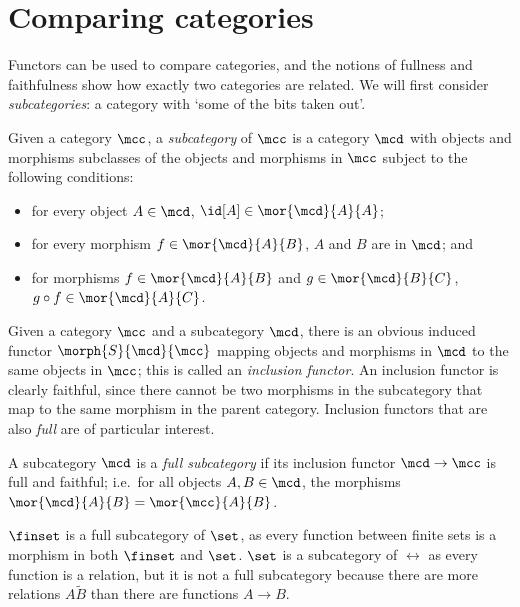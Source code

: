 \section{Comparing categories}

Functors can be used to compare categories, and the notions of fullness and
faithfulness show how exactly two categories are related.
We will first consider \emph{subcategories}: a category with `some of the bits
taken out'.

\begin{definition}[Subcategory]
    Given a category \(\mcc\), a \emph{subcategory} of \(\mcc\) is a category
    \(\mcd\) with objects and morphisms subclasses of the objects and morphisms
    in \(\mcc\) subject to the following conditions:
    \begin{itemize}
        \item for every object \(A \in \mcd\), \(\id[A] \in \mor{\mcd}{A}{A}\);
        \item for every morphism \(f \in \mor{\mcd}{A}{B}\), \(A\) and \(B\) are
              in \(\mcd\); and
        \item for morphisms \(f \in \mor{\mcd}{A}{B}\) and
              \(g \in \mor{\mcd}{B}{C}\), \(g \circ f \in \mor{\mcd}{A}{C}\).
    \end{itemize}
\end{definition}

Given a category \(\mcc\) and a subcategory \(\mcd\), there is an obvious
induced functor \(\morph{S}{\mcd}{\mcc}\) mapping objects and morphisms
in \(\mcd\) to the same objects in \(\mcc\); this is called an
\emph{inclusion functor}.
An inclusion functor is clearly faithful, since there cannot be two morphisms in
the subcategory that map to the same morphism in the parent category.
Inclusion functors that are also \emph{full} are of particular interest.

\begin{definition}
    A subcategory \(\mcd\) is a \emph{full subcategory} if its inclusion functor
    \(\mcd \to \mcc\) is full and faithful; i.e.\ for all objects
    \(A, B \in \mcd\), the morphisms \(\mor{\mcd}{A}{B} = \mor{\mcc}{A}{B}\).
\end{definition}

\begin{example}
    \(\finset\) is a full subcategory of \(\set\), as every function between
    finite sets is a morphism in both \(\finset\) and \(\set\).
    \(\set\) is a subcategory of \(\rel\) as every function is a relation, but
    it is not a full subcategory because there are more relations \(A \tilde B\)
    than there are functions \(A \to B\).
\end{example}

